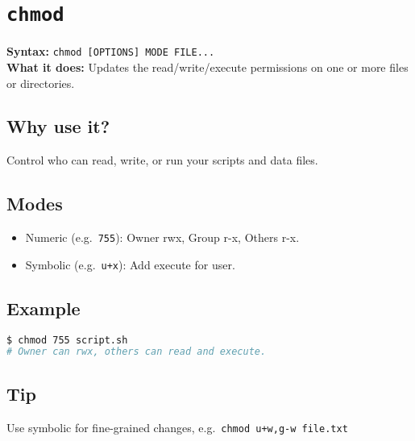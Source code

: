 \documentclass[10pt,oneside]{scrbook}
\begin{document}
\section{\texttt{chmod}}
\begin{cmdbox}
  \textbf{Syntax:} \lstinline!chmod [OPTIONS] MODE FILE...! \\
  \textbf{What it does:} Updates the read/write/execute permissions on one or more files or directories.
\end{cmdbox}
\begin{commanddetails}
  \subsection*{Why use it?}
    Control who can read, write, or run your scripts and data files.

  \subsection*{Modes}
    \begin{itemize}
      \item Numeric (e.g.\ \lstinline!755!): Owner rwx, Group r-x, Others r-x.
      \item Symbolic (e.g.\ \lstinline!u+x!): Add execute for user.
    \end{itemize}

  \subsection*{Example}
  \begin{lstlisting}[language=bash]
$ chmod 755 script.sh
# Owner can rwx, others can read and execute.
  \end{lstlisting}

  \subsection*{Tip}
    Use symbolic for fine-grained changes, e.g.\ \lstinline!chmod u+w,g-w file.txt!  
\end{commanddetails}

\end{document}
